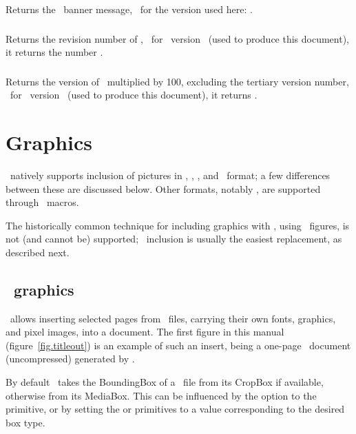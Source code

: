 \documentclass{pdftexmanual}
\begin{document}
Returns the \PDFTEX\ banner message, \eg\ for the version used here:
{\tt \pdftexbanner}. 

\subsection{}

Returns the revision number of \PDFTEX, \eg\ for \PDFTEX\ version
\currentpdftex\ (used to produce this document), it returns the number
{\tt \pdftexrevision}.

\subsection{}

Returns the version of \PDFTEX\ multiplied by 100, excluding the tertiary
version number, \eg\ for \PDFTEX\ version \currentpdftex\ (used to
produce this document), it returns {\tt \number\pdftexversion}.

\chapter{Graphics}
\label{chap.graphics}

\PDFTEX\ natively supports inclusion of pictures in \PNG, \JPEG,
\JBIGTWO, and \PDF\ format; a few differences between these are
discussed below. Other formats, notably \METAPOST, are supported through
\TEX\ macros.

The historically common technique for including graphics with \TEX,
using \EPS\ figures, is not (and cannot be) supported; \PDF\ inclusion
is usually the easiest replacement, as described next.

\section{\PDF\ graphics}

\PDFTEX\ allows inserting selected pages from \PDF\ files, carrying
their own fonts, graphics, and pixel images, into a document. The first
figure in this manual (figure~\ref{fig.titleout}) is an example of such
an insert, being a one-page \PDF\ document (uncompressed) generated by
\PDFTEX.

By default \PDFTEX\ takes the BoundingBox of a \PDF\ file from its
CropBox if available, otherwise from its MediaBox. This can be
influenced by the  option to the 
primitive, or by setting the  or 
primitives to a value corresponding to the desired box type.
\end{document}
